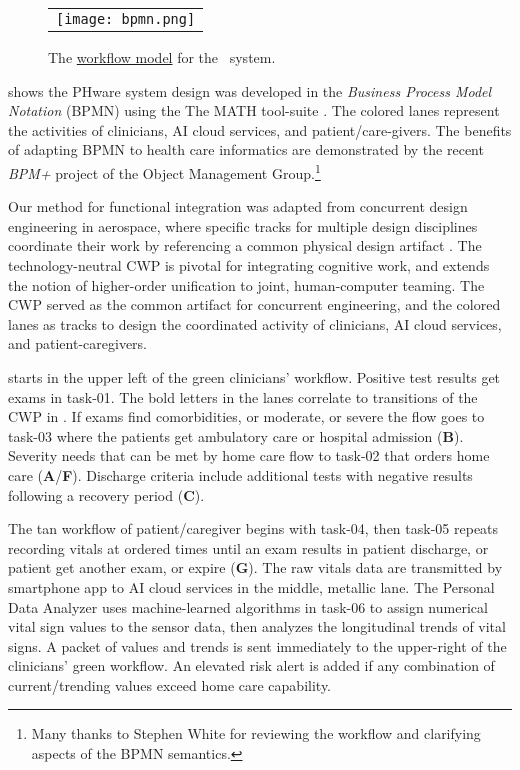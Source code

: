 \begin{figure*}
  \begin{center}
    \begin{tabular}{c}
      \texttt{[image: bpmn.png]}
    \end{tabular}
  \end{center}
\caption{The \href{https://github.com/ericmercer/SPIN-bpmn-cwp-verification-paper/blob/main/16-Feb-2022-BPMN-resources.png}{workflow model} for the \phware\ system.}
\label{fig:bpmn}
\end{figure*}

 shows the PHware system design was developed in the \emph{Business Process Model Notation} (BPMN) \cite{BPMN} \cite{BPMNSpecification} using the The MATH tool-suite \cite{workflowmodel}.
The colored lanes represent the activities of clinicians, AI cloud services, and patient/care-givers.
The benefits of adapting BPMN to health care informatics are demonstrated by the recent \emph{BPM+} project of the Object Management Group.\footnote{Many thanks to Stephen White for reviewing the workflow and clarifying aspects of the BPMN semantics.}

Our method for functional integration was adapted from concurrent design engineering in aerospace, where specific tracks for multiple design disciplines coordinate their work by referencing a common physical design artifact \cite{10.1007/978-1-4471-1538-0_9}.
The technology-neutral CWP is pivotal for integrating cognitive work, and extends the notion of higher-order unification \cite{10.1007/3-540-45685-6_2} to joint, human-computer teaming. The CWP served as the common artifact for concurrent engineering, and the colored lanes as tracks to design the coordinated activity of clinicians, AI cloud services, and patient-caregivers. %

 starts in the upper left of the green clinicians' workflow.
Positive test results get exams in task-01. The bold letters in the lanes correlate to transitions of the CWP in .
If exams find comorbidities, or moderate, or severe the flow goes to task-03 where the patients get ambulatory care or hospital admission (\textbf{B}).
Severity needs that can be met by home care flow to task-02 that orders home care (\textbf{A}/\textbf{F}).
Discharge criteria include additional tests with negative results following a recovery period (\textbf{C}).

The tan workflow of patient/caregiver begins with task-04, then task-05 repeats recording vitals at ordered times until an exam results in patient discharge, or patient get another exam, or expire (\textbf{G}). 
The raw vitals data are transmitted by smartphone app to AI cloud services in the middle, metallic lane. The Personal Data Analyzer uses machine-learned algorithms in task-06 to assign numerical vital sign values to the sensor data, then analyzes the longitudinal trends of vital signs.
A packet of values and trends is sent immediately to the upper-right of the clinicians' green workflow. An elevated risk alert is added if any combination of current/trending values exceed home care capability.

